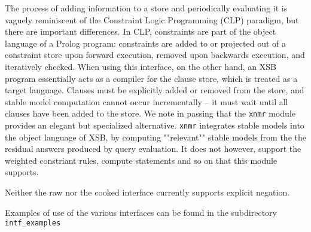The process of adding information to a store and periodically
evaluating it is vaguely reminiscent of the Constraint Logic
Programming (CLP) paradigm, but there are important differences.  In
CLP, constraints are part of the object language of a Prolog program:
constraints are added to or projected out of a constraint store upon
forward execution, removed upon backwards execution, and iteratively
checked.  When using this interface, on the other hand, an XSB program
essentially acts as a compiler for the clause store, which is treated
as a target language.  Clauses must be explicitly added or removed
from the store, and stable model computation cannot occur
incrementally -- it must wait until all clauses have been added to the
store.  We note in passing that the {\tt xnmr} module provides an
elegant but specialized alternative.  {\tt xnmr} integrates stable
models into the object language of XSB, by computing ""relevant""
stable models from the the residual answers produced by query
evaluation.  It does not however, support the weighted constriant
rules, compute statements and so on that this module supports.

Neither the raw nor the cooked interface currently supports explicit
negation.

Examples of use of the various interfaces can be found in the
subdirectory {\tt intf\_examples}

